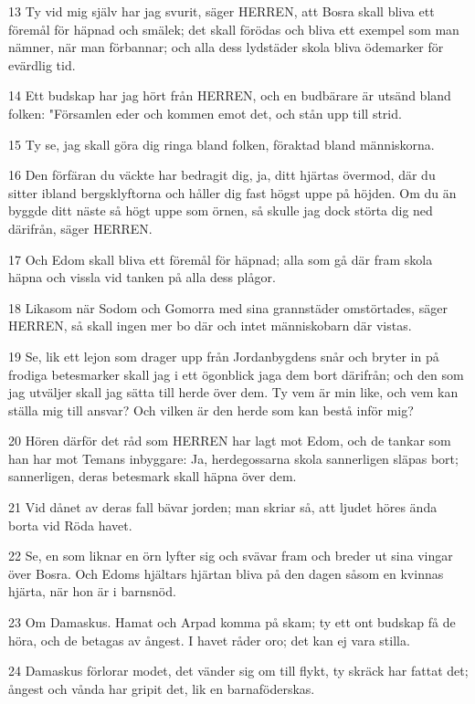 \par 13 Ty vid mig själv har jag svurit, säger HERREN, att Bosra skall bliva ett föremål för häpnad och smälek; det skall förödas och bliva ett exempel som man nämner, när man förbannar; och alla dess lydstäder skola bliva ödemarker för evärdlig tid.
\par 14 Ett budskap har jag hört från HERREN, och en budbärare är utsänd bland folken: "Församlen eder och kommen emot det, och stån upp till strid.
\par 15 Ty se, jag skall göra dig ringa bland folken, föraktad bland människorna.
\par 16 Den förfäran du väckte har bedragit dig, ja, ditt hjärtas övermod, där du sitter ibland bergsklyftorna och håller dig fast högst uppe på höjden. Om du än byggde ditt näste så högt uppe som örnen, så skulle jag dock störta dig ned därifrån, säger HERREN.
\par 17 Och Edom skall bliva ett föremål för häpnad; alla som gå där fram skola häpna och vissla vid tanken på alla dess plågor.
\par 18 Likasom när Sodom och Gomorra med sina grannstäder omstörtades, säger HERREN, så skall ingen mer bo där och intet människobarn där vistas.
\par 19 Se, lik ett lejon som drager upp från Jordanbygdens snår och bryter in på frodiga betesmarker skall jag i ett ögonblick jaga dem bort därifrån; och den som jag utväljer skall jag sätta till herde över dem. Ty vem är min like, och vem kan ställa mig till ansvar? Och vilken är den herde som kan bestå inför mig?
\par 20 Hören därför det råd som HERREN har lagt mot Edom, och de tankar som han har mot Temans inbyggare: Ja, herdegossarna skola sannerligen släpas bort; sannerligen, deras betesmark skall häpna över dem.
\par 21 Vid dånet av deras fall bävar jorden; man skriar så, att ljudet höres ända borta vid Röda havet.
\par 22 Se, en som liknar en örn lyfter sig och svävar fram och breder ut sina vingar över Bosra. Och Edoms hjältars hjärtan bliva på den dagen såsom en kvinnas hjärta, när hon är i barnsnöd.
\par 23 Om Damaskus. Hamat och Arpad komma på skam; ty ett ont budskap få de höra, och de betagas av ångest. I havet råder oro; det kan ej vara stilla.
\par 24 Damaskus förlorar modet, det vänder sig om till flykt, ty skräck har fattat det; ångest och vånda har gripit det, lik en barnaföderskas.
